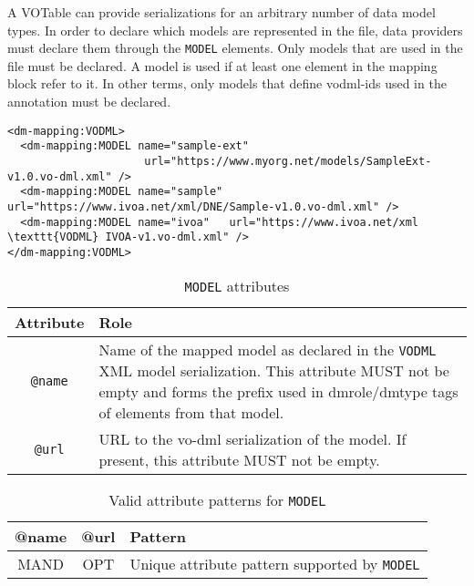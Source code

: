 A VOTable can provide serializations for an arbitrary number of data model
types. In order to declare which models are represented in the file, data
providers must declare them through the \texttt{MODEL} elements.
Only models that are used in the file must be declared. A model is
used if at least one element in the mapping block refer to it. In other terms, only models that define vodml-ids used in the
annotation must be declared.

\begin{lstlisting}[frame=single,caption={Example \texttt{MODEL} mapping block},style=XML,basicstyle=\tiny]
<dm-mapping:VODML>
  <dm-mapping:MODEL name="sample-ext"
                     url="https://www.myorg.net/models/SampleExt-v1.0.vo-dml.xml" />
  <dm-mapping:MODEL name="sample" url="https://www.ivoa.net/xml/DNE/Sample-v1.0.vo-dml.xml" />
  <dm-mapping:MODEL name="ivoa"   url="https://www.ivoa.net/xml \texttt{VODML} IVOA-v1.vo-dml.xml" />
</dm-mapping:VODML>
\end{lstlisting}

\begin{table}[!htbp]
  \small
  \centering
  \begin{tabulary}{\linewidth}{|c|J|}       
    \hline 
         \textbf{Attribute} & 
         \textbf {Role}\\
    \hline
    \hline  
         \texttt{@name}  & 
         Name of the mapped model as declared in the \texttt{VODML} XML model serialization.  This attribute MUST not be empty and forms the prefix used in dmrole/dmtype tags of elements from that model.  \\
    \hline 
         \texttt{@url} & 
         URL to the vo-dml serialization of the model. If present, this attribute MUST not be empty.\\
    \hline 
  \end{tabulary}
  \caption{\texttt{MODEL} attributes} 
  \label{tbl:model-att}
\end{table}


\begin{table}[!htbp]
  \small
  \centering
  \begin{tabulary}{\linewidth}{|c |c |J|}
    \hline 
        \textbf{@name} &
        \textbf{@url} &
        \textbf{Pattern}\\
    \hline      \hline  
        MAND &           
        OPT &           
        Unique attribute pattern supported by \texttt{MODEL}\\
    \hline 
  \end{tabulary}
  \caption{Valid attribute patterns for  \texttt{MODEL}} 
  \label{tbl:model-pattern}
\end{table}
